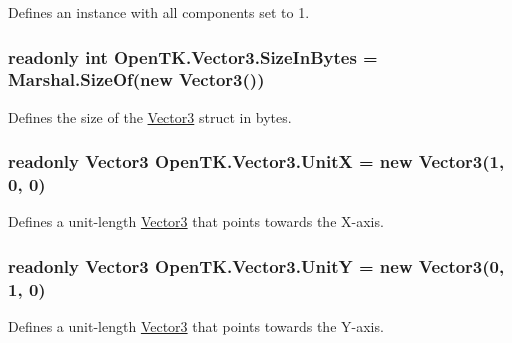 Defines an instance with all components set to 1. 

\hypertarget{struct_open_t_k_1_1_vector3_ae7cbee02af524095ee72226d842c6892}{
\subsubsection[{Size\-In\-Bytes}]{\setlength{\rightskip}{0pt plus 5cm}readonly int Open\-T\-K.\-Vector3.\-Size\-In\-Bytes = Marshal.\-Size\-Of(new {\bf Vector3}())\hspace{0.3cm}{\ttfamily [static]}}}\label{struct_open_t_k_1_1_vector3_ae7cbee02af524095ee72226d842c6892}


Defines the size of the \hyperlink{struct_open_t_k_1_1_vector3}{Vector3} struct in bytes. 

\hypertarget{struct_open_t_k_1_1_vector3_a54bca41090c546209620c5cbad1f0a40}{
\subsubsection[{Unit\-X}]{\setlength{\rightskip}{0pt plus 5cm}readonly {\bf Vector3} Open\-T\-K.\-Vector3.\-Unit\-X = new {\bf Vector3}(1, 0, 0)\hspace{0.3cm}{\ttfamily [static]}}}\label{struct_open_t_k_1_1_vector3_a54bca41090c546209620c5cbad1f0a40}


Defines a unit-\/length \hyperlink{struct_open_t_k_1_1_vector3}{Vector3} that points towards the X-\/axis. 

\hypertarget{struct_open_t_k_1_1_vector3_acbc98b807526c6eecc9fc75e9a819db5}{
\subsubsection[{Unit\-Y}]{\setlength{\rightskip}{0pt plus 5cm}readonly {\bf Vector3} Open\-T\-K.\-Vector3.\-Unit\-Y = new {\bf Vector3}(0, 1, 0)\hspace{0.3cm}{\ttfamily [static]}}}\label{struct_open_t_k_1_1_vector3_acbc98b807526c6eecc9fc75e9a819db5}


Defines a unit-\/length \hyperlink{struct_open_t_k_1_1_vector3}{Vector3} that points towards the Y-\/axis. 

